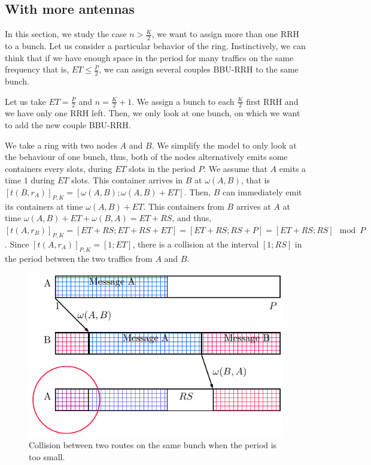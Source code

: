 \documentclass[]{algotel}
\begin{document}
\subsection{With more antennas}
\label{sec:optialgo}
 In this section, we study the case $n > \frac{K}{2}$, we want to assign more than one RRH to a bunch. 
 Let us consider a particular behavior of the ring. Instinctively, we can think that if we have enough space in the period for many traffics on the same frequency that is, $ET \le \frac{P}{2}$, we can assign several couples BBU-RRH to the same bunch.

 Let us take $ET =  \frac{P}{2}$ and $n = \frac{K}{2} + 1$. We assign a bunch to each $\frac{K}{2}$ first RRH and we have only one RRH left. Then, we only look at one bunch, on which we want to add the new couple BBU-RRH. 
 
 We take a ring with two nodes $A$ and $B$. We simplify the model to only look at the behaviour of one bunch, thus, both of the nodes alternatively emits some containers every slots, during $ET$ slots in the period $P$. We assume that $A$ emits a time $1$ during $ET$ slots. This container arrives in $B$ at $\omega(A,B)$, that is  $[t(B,r_A)]_{P,K} = [\omega(A,B);\omega(A,B)+ET]$. Then, $B$ can immediately emit its containers at time $\omega(A,B)+ET$. This containers from $B$ arrives at $A$ at time $\omega(A,B)+ET + \omega(B,A) = ET + RS$, and thus, $[t(A,r_B)]_{P,K} = [ET + RS;ET + RS + ET] = [ET+RS; RS + P] = [ET + RS; RS] \mod P$. Since $[t(A,r_A)]_{P,K} = [1;ET]$, there is a collision at the interval $[1;RS]$ in the period between the two traffics from $A$ and $B$.
  \begin{figure}[h]
\centering
      \includegraphics[scale=0.7]{rs.pdf}
     \caption{Collision between two routes on the same bunch when the period is too small.}   \label{fig:proofrs}
  \end{figure}
\end{document}
